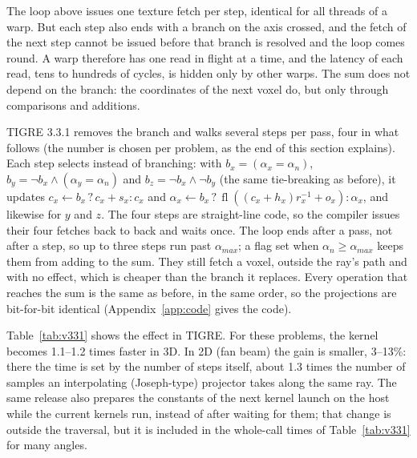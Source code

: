 \documentclass[11pt,a4paper]{article}
\theoremstyle{remark}
\newcommand{\fl}{\operatorname{fl}}
\begin{document}
The loop above issues one texture fetch per step, identical for all threads of a warp. But each step also ends
with a branch on the axis crossed, and the fetch of the next step cannot be issued before that branch is
resolved and the loop comes round. A warp therefore has one read in flight at a time, and the latency of
each read, tens to hundreds of cycles, is hidden only by other warps. The sum does not depend on the branch:
the coordinates of the next voxel do, but only through comparisons and additions.

TIGRE 3.3.1 removes the branch and walks several steps per pass, four in what follows (the number is chosen
per problem, as the end of this section explains). Each step selects instead of branching: with
$b_x=(\alpha_x=\alpha_n)$, $b_y=\lnot b_x\wedge(\alpha_y=\alpha_n)$ and $b_z=\lnot b_x\wedge\lnot b_y$ (the same
tie-breaking as before), it updates $c_x\gets b_x\,?\,c_x+s_x : c_x$ and $\alpha_x\gets b_x\,?\,\fl((c_x+h_x)r_x^{-1}+o_x) :
\alpha_x$, and likewise for $y$ and $z$. The four steps are straight-line code, so the compiler issues their four
fetches back to back and waits once. The loop ends after a pass, not after a step, so up to three steps run
past $\alpha_{max}$; a flag set when $\alpha_n\ge\alpha_{max}$ keeps them from adding to the sum. They still
fetch a voxel, outside the ray's path and with no effect, which is cheaper than the branch it replaces. Every
operation that reaches the sum is the same as before, in the same order, so the projections are bit-for-bit
identical (Appendix~\ref{app:code} gives the code).

Table~\ref{tab:v331} shows the effect in TIGRE. For these problems, the kernel becomes 1.1--1.2 times faster in 3D. In 2D (fan beam)
the gain is smaller, 3--13\%: there the time is set by the number of steps itself, about 1.3 times the number
of samples an interpolating (Joseph-type) projector takes along the same ray. The same release also prepares the constants of the next kernel launch on the host
while the current kernels run, instead of after waiting for them; that change is outside the traversal, but
it is included in the whole-call times of Table~\ref{tab:v331} for many angles.
\end{document}
